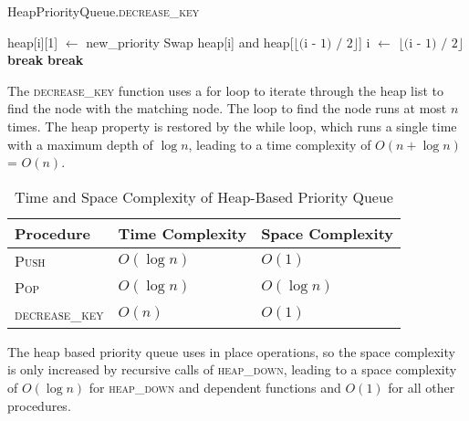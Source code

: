 \documentclass[12pt]{article}
\begin{document}
\begin{algorithm}
    \caption{HeapPriorityQueue.\textsc{decrease\_key}}
    \begin{algorithmic}[1]
         
            \State heap[i][1] $\gets$ new\_priority
             
                    \State Swap heap[i] and heap[$\lfloor \text{(i - 1) / 2} \rfloor$]
                    \State i $\gets$ $\lfloor \text{(i - 1) / 2} \rfloor$
                \Else
                    \State \textbf{break}
                \EndIf
            \EndWhile
            \State \textbf{break}
        \EndFor
    \end{algorithmic}
\end{algorithm}

The \textsc{decrease\_key} function uses a for loop to iterate through the heap list
to find the node with the matching node. The loop to find the node runs at most $n$
times. The heap property is restored by the while loop, which runs a single time with a
maximum depth of $\log{n}$, leading to a time complexity of $O(n + \log{n})$ = $O(n)$.

\begin{table}[H]
    \centering
    \begin{threeparttable}
        \caption{Time and Space Complexity of Heap-Based Priority Queue}
        \begin{tabular*}{0.8\textwidth}{@{\extracolsep{\fill}}lll@{}}
            \toprule
            \textbf{Procedure} & \textbf{Time Complexity} & \textbf{Space Complexity} \\ \midrule
            \textsc{Push}      & $O(\log n)$ & $O(1)$        \\
            \textsc{Pop}       & $O(\log n)$ & $O(\log n)$   \\
            \textsc{decrease\_key} & $O(n)$  & $O(1)$        \\
            \bottomrule
        \end{tabular*}
    \end{threeparttable}
\end{table}

The heap based priority queue uses in place operations, so the space complexity is only
increased by recursive calls of \textsc{heap\_down}, leading to a space complexity of $O(\log{n})$ for
\textsc{heap\_down} and dependent functions and $O(1)$ for all other procedures.
\end{document}
